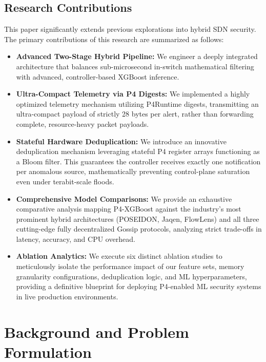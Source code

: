 \documentclass[sigconf, nonacm]{acmart}
\begin{document}
\subsection{Research Contributions}
This paper significantly extends previous explorations into hybrid SDN security. The primary contributions of this research are summarized as follows:
\begin{itemize}
    \item \textbf{Advanced Two-Stage Hybrid Pipeline:} We engineer a deeply integrated architecture that balances sub-microsecond in-switch mathematical filtering with advanced, controller-based XGBoost inference.
    \item \textbf{Ultra-Compact Telemetry via P4 Digests:} We implemented a highly optimized telemetry mechanism utilizing P4Runtime digests, transmitting an ultra-compact payload of strictly 28 bytes per alert, rather than forwarding complete, resource-heavy packet payloads.
    \item \textbf{Stateful Hardware Deduplication:} We introduce an innovative deduplication mechanism leveraging stateful P4 register arrays functioning as a Bloom filter. This guarantees the controller receives exactly one notification per anomalous source, mathematically preventing control-plane saturation even under terabit-scale floods.
    \item \textbf{Comprehensive Model Comparisons:} We provide an exhaustive comparative analysis mapping P4-XGBoost against the industry's most prominent hybrid architectures (POSEIDON, Jaqen, FlowLens) and all three cutting-edge fully decentralized Gossip protocols, analyzing strict trade-offs in latency, accuracy, and CPU overhead.
    \item \textbf{Ablation Analytics:} We execute six distinct ablation studies to meticulously isolate the performance impact of our feature sets, memory granularity configurations, deduplication logic, and ML hyperparameters, providing a definitive blueprint for deploying P4-enabled ML security systems in live production environments.
\end{itemize}

\section{Background and Problem Formulation}
\end{document}
